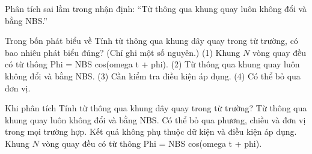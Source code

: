 \begin{bt}
Phân tích sai lầm trong nhận định: “Từ thông qua khung quay luôn không đổi và bằng NBS.”
\end{bt}

\begin{ex}
Trong bốn phát biểu về Tính từ thông qua khung dây quay trong từ trường, có bao nhiêu phát biểu đúng? (Chỉ ghi một số nguyên.) (1) Khung $N$ vòng quay đều có từ thông Phi = NBS cos(omega t + phi). (2) Từ thông qua khung quay luôn không đổi và bằng NBS. (3) Cần kiểm tra điều kiện áp dụng. (4) Có thể bỏ qua đơn vị.
\end{ex}

\begin{ex}
Khi phân tích Tính từ thông qua khung dây quay trong từ trường?
\choice
{Từ thông qua khung quay luôn không đổi và bằng NBS.}
{Có thể bỏ qua phương, chiều và đơn vị trong mọi trường hợp.}
{Kết quả không phụ thuộc dữ kiện và điều kiện áp dụng.}
{\True Khung $N$ vòng quay đều có từ thông Phi = NBS cos(omega t + phi).}
\end{ex}


